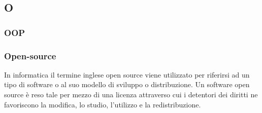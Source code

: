 \subsection*{\textbf{\hfill \Huge{O} \hfill}} 
\subsubsection*{OOP}

\subsubsection*{Open-source}
In informatica il termine inglese open source viene utilizzato per riferirsi ad un tipo di software o al suo modello di sviluppo o distribuzione. Un software open source è reso tale per mezzo di una licenza attraverso cui i detentori dei diritti ne favoriscono la modifica, lo studio, l'utilizzo e la redistribuzione.
